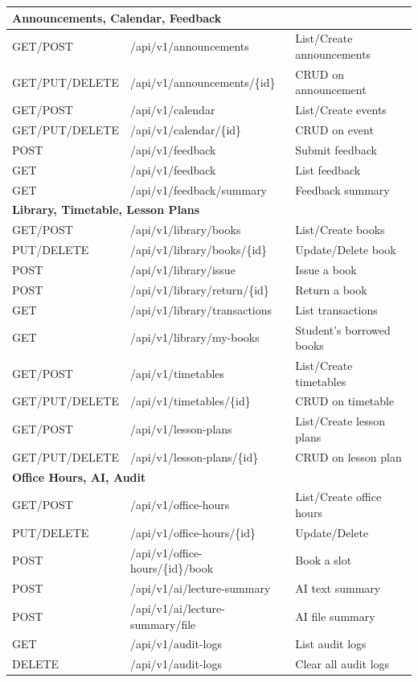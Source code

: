 \begin{longtable}{|l|p{5cm}|p{5.5cm}|}
\multicolumn{3}{|l|}{\textbf{Announcements, Calendar, Feedback}} \\
\hline
GET/POST & /api/v1/announcements & List/Create announcements \\
\hline
GET/PUT/DELETE & /api/v1/announcements/\{id\} & CRUD on announcement \\
\hline
GET/POST & /api/v1/calendar & List/Create events \\
\hline
GET/PUT/DELETE & /api/v1/calendar/\{id\} & CRUD on event \\
\hline
POST & /api/v1/feedback & Submit feedback \\
\hline
GET & /api/v1/feedback & List feedback \\
\hline
GET & /api/v1/feedback/summary & Feedback summary \\
\hline

\multicolumn{3}{|l|}{\textbf{Library, Timetable, Lesson Plans}} \\
\hline
GET/POST & /api/v1/library/books & List/Create books \\
\hline
PUT/DELETE & /api/v1/library/books/\{id\} & Update/Delete book \\
\hline
POST & /api/v1/library/issue & Issue a book \\
\hline
POST & /api/v1/library/return/\{id\} & Return a book \\
\hline
GET & /api/v1/library/transactions & List transactions \\
\hline
GET & /api/v1/library/my-books & Student's borrowed books \\
\hline
GET/POST & /api/v1/timetables & List/Create timetables \\
\hline
GET/PUT/DELETE & /api/v1/timetables/\{id\} & CRUD on timetable \\
\hline
GET/POST & /api/v1/lesson-plans & List/Create lesson plans \\
\hline
GET/PUT/DELETE & /api/v1/lesson-plans/\{id\} & CRUD on lesson plan \\
\hline

\multicolumn{3}{|l|}{\textbf{Office Hours, AI, Audit}} \\
\hline
GET/POST & /api/v1/office-hours & List/Create office hours \\
\hline
PUT/DELETE & /api/v1/office-hours/\{id\} & Update/Delete \\
\hline
POST & /api/v1/office-hours/\{id\}/book & Book a slot \\
\hline
POST & /api/v1/ai/lecture-summary & AI text summary \\
\hline
POST & /api/v1/ai/lecture-summary/file & AI file summary \\
\hline
GET & /api/v1/audit-logs & List audit logs \\
\hline
DELETE & /api/v1/audit-logs & Clear all audit logs \\
\hline
\end{longtable}

